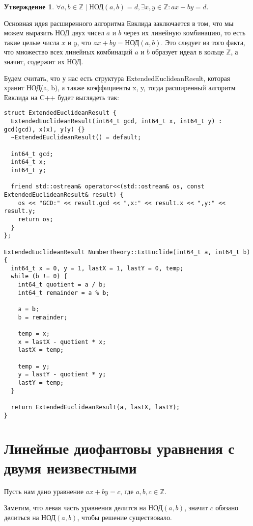 \documentclass[12pt, a4paper, openany]{book}
\newtheorem*{statement}{Утверждение}
\begin{document}
\begin{statement}
$\forall a, b \in \mathbb{Z} \mid \text{НОД}(a, b) = d, \exists x, y \in \mathbb{Z}: ax + by = d$.
\end{statement}

Основная идея расширенного алгоритма Евклида заключается в том, что мы можем выразить НОД двух чисел $a$ и $b$ через их линейную комбинацию, то есть такие целые числа $x$ и $y$, что $ax + by = \text{НОД}(a, b)$. Это следует из того факта, что множество всех линейных комбинаций $a$ и $b$ образует идеал в кольце $\mathbb{Z}$, а значит, содержит их НОД.

Будем считать, что у нас есть структура ExtendedEuclideanResult, которая хранит НОД(a, b), а также коэффициенты x, y, тогда расширенный алгоритм Евклида на C++ будет выглядеть так:

\newpage
\begin{lstlisting}[breaklines=true]
struct ExtendedEuclideanResult {
  ExtendedEuclideanResult(int64_t gcd, int64_t x, int64_t y) : gcd(gcd), x(x), y(y) {}
  ~ExtendedEuclideanResult() = default;

  int64_t gcd;
  int64_t x;
  int64_t y;

  friend std::ostream& operator<<(std::ostream& os, const ExtendedEuclideanResult& result) {
    os << "GCD:" << result.gcd << ",x:" << result.x << ",y:" << result.y;
    return os;
  }
};

ExtendedEuclideanResult NumberTheory::ExtEuclide(int64_t a, int64_t b) {
  int64_t x = 0, y = 1, lastX = 1, lastY = 0, temp;
  while (b != 0) {
    int64_t quotient = a / b;
    int64_t remainder = a % b;

    a = b;
    b = remainder;

    temp = x;
    x = lastX - quotient * x;
    lastX = temp;

    temp = y;
    y = lastY - quotient * y;
    lastY = temp;
  }

  return ExtendedEuclideanResult(a, lastX, lastY);
}
\end{lstlisting}

\section{Линейные диофантовы уравнения с двумя
неизвестными}

Пусть нам дано уравнение $ax + by = c$, где $a, b, c \in \mathbb{Z}$.

Заметим, что левая часть уравнения делится на $\text{НОД}(a, b)$, значит $c$ обязано делиться на $\text{НОД}(a, b)$, чтобы решение существовало.
\end{document}
